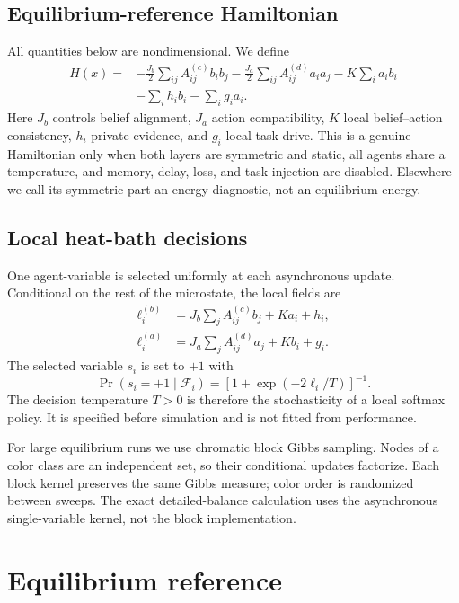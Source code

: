 \documentclass[12pt]{article}
\begin{document}
\subsection{Equilibrium-reference Hamiltonian}

All quantities below are nondimensional. We define
\begin{align}
 H(x)={}&-\frac{J_b}{2}\sum_{ij}A^{(c)}_{ij}b_i b_j
         -\frac{J_a}{2}\sum_{ij}A^{(d)}_{ij}a_i a_j
         -K\sum_i a_i b_i \nonumber\\
       &-\sum_i h_i b_i-\sum_i g_i a_i .
 \label{eq:hamiltonian}
\end{align}
Here $J_b$ controls belief alignment, $J_a$ action compatibility, $K$ local
belief--action consistency, $h_i$ private evidence, and $g_i$ local task drive.
This is a genuine Hamiltonian only when both layers are symmetric and static,
all agents share a temperature, and memory, delay, loss, and task injection are
disabled. Elsewhere we call its symmetric part an energy diagnostic, not an
equilibrium energy.

\subsection{Local heat-bath decisions}

One agent-variable is selected uniformly at each asynchronous update. Conditional
on the rest of the microstate, the local fields are
\begin{align}
 \ell_i^{(b)}&=J_b\sum_j A^{(c)}_{ij}b_j+K a_i+h_i,\\
 \ell_i^{(a)}&=J_a\sum_j A^{(d)}_{ij}a_j+K b_i+g_i.
\end{align}
The selected variable $s_i$ is set to $+1$ with
\begin{equation}
 \Pr(s_i=+1\mid\mathcal F_i)
 =\left[1+\exp\left(-2\ell_i/T\right)\right]^{-1}.
 \label{eq:heatbath}
\end{equation}
The decision temperature $T>0$ is therefore the stochasticity of a local
softmax policy. It is specified before simulation and is not fitted from
performance.

For large equilibrium runs we use chromatic block Gibbs sampling. Nodes of a
color class are an independent set, so their conditional updates factorize.
Each block kernel preserves the same Gibbs measure; color order is randomized
between sweeps. The exact detailed-balance calculation uses the asynchronous
single-variable kernel, not the block implementation.

\section{Equilibrium reference}
\end{document}
